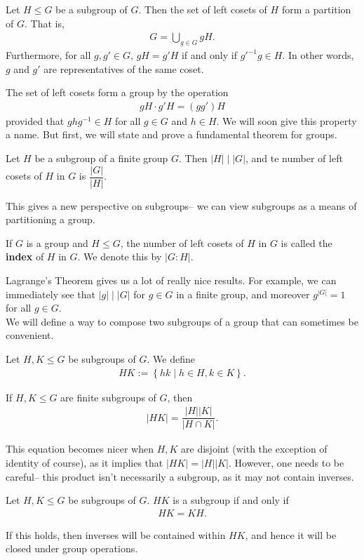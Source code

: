 \documentclass{memoir}
\begin{document}
\begin{prop}
	Let \(H\leq G\) be a subgroup of \(G\). Then the set of left cosets of \(H\) form a partition of \(G\). That is,
	\begin{align*}
		G = \bigcup_{g \in G} gH.
	\end{align*}
	Furthermore, for all \(g,g' \in G\), \(gH = g'H\) if and only if \(g'^{-1}g \in H\). In other words, \(g\) and \(g'\) are representatives of the same coset.
\end{prop}
The set of left cosets form a group by the operation
\begin{align*}
	gH \cdot g'H = (gg')H
\end{align*}
provided that \(ghg^{-1} \in H\) for all \(g \in G\) and \(h \in H\). We will soon give this property a name. But first, we will state and prove a fundamental theorem for groups.

\begin{thm}
	Let \(H\) be a subgroup of a finite group \(G\). Then \(\left| H \right| \mid \left| G \right| \), and te number of left cosets of \(H\) in \(G\) is \(\dfrac{\left| G \right| }{\left| H \right| }\).
\end{thm}
This gives a new perspective on subgroups-- we can view subgroups as a means of partitioning a group.

\begin{defn}[Index]
	If \(G\) is a group and \(H\leq G\), the number of left cosets of \(H\) in \(G\) is called the \textbf{index} of \(H \) in \(G\). We denote this by \(\left| G : H \right| \).
\end{defn}
Lagrange's Theorem gives us a lot of really nice results. For example, we can immediately see that \(\left| g \right| \mid \left| G \right| \) for \(g \in G\) in a finite group, and moreover \(g^{\left| G \right| }= 1\) for all \(g \in G\).\\

We will define a way to compose two subgroups of a group that can sometimes be convenient.

\begin{defn}
	Let \(H,K \leq G\) be subgroups of \(G\). We define
	\begin{align*}
		HK := \left\{hk \mid h \in H, k \in K \right\} .
	\end{align*}
\end{defn}

\begin{prop}
	If \(H,K\leq G\) are finite subgroups of \(G\), then
	\begin{align*}
		\left| HK \right| = \dfrac{\left| H \right| \left| K \right| }{\left| H \cap K \right| }.
	\end{align*}
\end{prop}
This equation becomes nicer when \(H,K\) are disjoint (with the exception of identity of course), as it implies that \(\left| HK \right|  = \left| H \right| \left| K \right| \). However, one needs to be careful-- this product isn't necessarily a subgroup, as it may not contain inverses.

\begin{prop}
	Let \(H,K \leq G\) be subgroups of \(G\). \(HK\) is a subgroup if and only if
	\begin{align*}
		HK = KH.
	\end{align*}
\end{prop}
If this holds, then inverses will be contained within \(HK\), and hence it will be closed under group operations.
\end{document}
